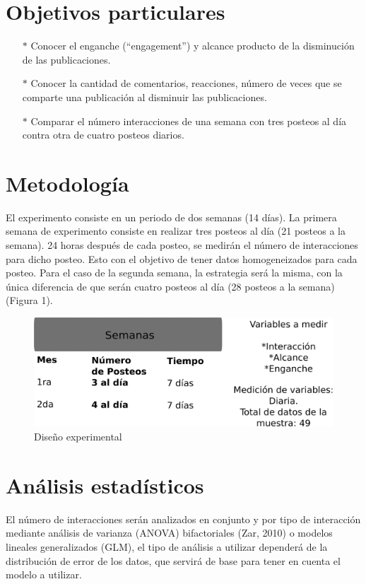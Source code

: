 \documentclass[a4paper,10pt]{article}
\begin{document}
\section{Objetivos particulares}
  \begin{itemize}
   \item[$*$] Conocer el enganche (``engagement'') y alcance producto de la disminución de las publicaciones.
   \item[$*$] Conocer la cantidad de comentarios, reacciones, número de veces que se comparte una publicación al disminuir las publicaciones.
   \item[$*$] Comparar el número interacciones de una semana con tres posteos al día contra otra de cuatro posteos diarios.
  \end{itemize}


\section{Metodología}
El experimento consiste en un periodo de dos semanas (14 días).
La primera semana de experimento consiste en realizar tres posteos al día (21 posteos a la semana).
24 horas después de cada posteo, se medirán el número de interacciones para dicho posteo.
Esto con el objetivo de tener datos homogeneizados para cada posteo.
Para el caso de la segunda semana, la estrategia será la misma, con la única diferencia de que serán cuatro posteos
al día (28 posteos a la semana) (Figura 1).
\begin{figure}[h]
  \begin{center}
   \includegraphics[width=.75\textwidth]{imagenes/dibujoExperimentoNuevo.png}
   \caption{Diseño experimental}
  \end{center}

 
\end{figure}



\section{Análisis estadísticos}
El número de interacciones serán analizados en conjunto y por tipo de interacción mediante análisis de varianza (ANOVA) bifactoriales (Zar, 2010) 
o modelos lineales generalizados (GLM), el tipo de análisis a utilizar dependerá de la distribución de error de los datos, 
que servirá de base para tener en cuenta el modelo a utilizar.
\end{document}
